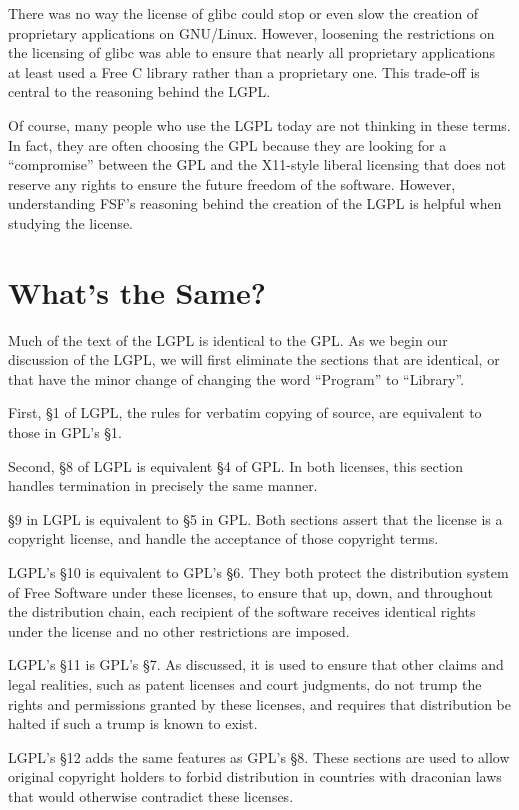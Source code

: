 \documentclass[12pt]{report}
\begin{document}
There was no way the license of glibc could stop or even slow the creation
of proprietary applications on GNU/Linux.  However, loosening the
restrictions on the licensing of glibc was able to ensure that nearly all
proprietary applications at least used a Free C library rather than a
proprietary one.  This trade-off is central to the reasoning behind the
LGPL\@.

Of course, many people who use the LGPL today are not thinking in these
terms.  In fact, they are often choosing the GPL because they are looking
for a ``compromise'' between the GPL and the X11-style liberal licensing
that does not reserve any rights to ensure the future freedom of the
software.  However, understanding FSF's reasoning behind the creation of
the LGPL is helpful when studying the license.


\section{What's the Same?}

Much of the text of the LGPL is identical to the GPL\@.  As we begin our
discussion of the LGPL, we will first eliminate the sections that are
identical, or that have the minor change of changing the word ``Program''
to ``Library''.

First, \S 1 of LGPL, the rules for verbatim copying of source, are
equivalent to those in GPL's \S 1.

Second, \S 8 of LGPL is equivalent \S 4 of GPL\@.  In both licenses, this
section handles termination in precisely the same manner.

\S 9 in LGPL is equivalent to \S 5 in GPL\@.  Both sections assert that
the license is a copyright license, and handle the acceptance of those
copyright terms.

LGPL's \S 10 is equivalent to GPL's \S 6.  They both protect the
distribution system of Free Software under these licenses, to ensure that
up, down, and throughout the distribution chain, each recipient of the
software receives identical rights under the license and no other
restrictions are imposed.

LGPL's \S 11 is GPL's \S 7.  As discussed, it is used to ensure that
other claims and legal realities, such as patent licenses and court
judgments, do not trump the rights and permissions granted by these
licenses, and requires that distribution be halted if such a trump is
known to exist.

LGPL's \S 12 adds the same features as GPL's \S 8.  These sections are
used to allow original copyright holders to forbid distribution in
countries with draconian laws that would otherwise contradict these
licenses.
\end{document}
